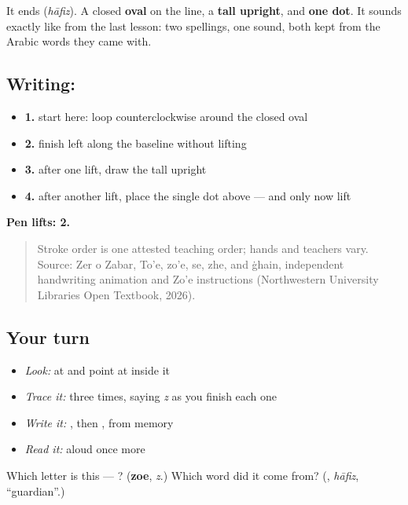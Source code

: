 It ends \textbf{} (\emph{hāfiz}). A closed \textbf{oval} on the line, a \textbf{tall upright}, and \textbf{one dot}. It sounds exactly like \textbf{} from the last lesson: two spellings, one sound, both kept from the Arabic words they came with.

\subsection*{Writing: }

\begin{itemize}
\raggedright
  \item \textbf{1.} start here: loop counterclockwise around the closed oval
  \item \textbf{2.} finish left along the baseline without lifting
  \item \textbf{3.} after one lift, draw the tall upright
  \item \textbf{4.} after another lift, place the single dot above — and only now lift
\end{itemize}

\textbf{Pen lifts: 2.}

\begin{quote}
Stroke order is one attested teaching order; hands and teachers vary. Source: Zer o Zabar, To’e, zo’e, se, zhe, and ġhain, independent  handwriting animation and Zo’e instructions (Northwestern University Libraries Open Textbook, 2026).
\end{quote}

\subsection*{Your turn}
\begin{itemize}
\raggedright
  \item \emph{Look:} at \textbf{} and point at  inside it
  \item \emph{Trace it:}  three times, saying \emph{z} as you finish each one
  \item \emph{Write it:} , then , from memory
  \item \emph{Read it:} \textbf{} aloud once more
\end{itemize}

\begin{tcolorbox}[breakable,colback=teal!4,colframe=teal!35!black,title={Before you move on}]
Which letter is this — ? (\textbf{zoe}, \emph{z}.) Which word did it come from? (\textbf{}, \emph{hāfiz}, \textquotedblleft{}guardian\textquotedblright{}.)
\end{tcolorbox}

